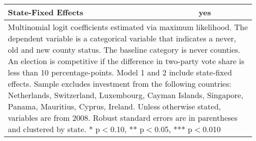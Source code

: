 \begin{table}[!htbp]
\begin{tabular}{l*{2}{c}}
State-Fixed Effects &         yes   &               \\
\hline\hline
\multicolumn{3}{p{\linewidth}}{\footnotesize Multinomial logit coefficients estimated via maximum likelihood. The dependent variable is a categorical variable that indicates a never, old and new county status. The baseline category is never counties. An election is competitive if the difference in two-party vote share is less than 10 percentage-points. Model 1 and 2 include state-fixed effects. Sample excludes investment from the following countries: Netherlands, Switzerland, Luxembourg, Cayman Islands, Singapore, Panama, Mauritius, Cyprus, Ireland. Unless otherwise stated, variables are from 2008. Robust standard errors are in parentheses and clustered by state. * p$<$0.10, ** p$<$0.05, *** p$<$0.010}\\
\end{tabular}
\end{table}
